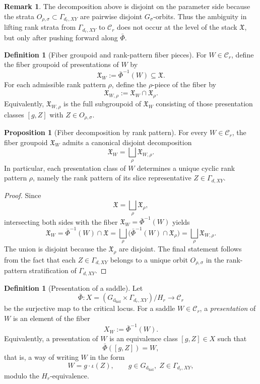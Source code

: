\documentclass{article}
\newcommand{\dhid}{\operatorname{d_{hid}}}
\theoremstyle{definition}
\newtheorem{proposition}[theorem]{Proposition}
\newtheorem{definition}[theorem]{Definition}
\newtheorem{remark}[theorem]{Remark}
\begin{document}
\begin{remark}
The decomposition above is disjoint on the parameter side because the strata
$O_{\rho,\sigma}\subset \Gamma_{d_r,XY}$ are pairwise disjoint $G_\sigma$-orbits. Thus the ambiguity in
lifting rank strata from $\Gamma_{d_r,XY}$ to $\mathcal C_r$ does not occur at the level of the stack
$\mathfrak X$, but only after pushing forward along $\bar\Phi$.
\end{remark}

\begin{definition}[Fiber groupoid and rank-pattern fiber pieces]
For $W\in \mathcal C_r$, define the fiber groupoid of presentations of $W$ by
\[
\mathfrak X_W
:=
\bar\Phi^{-1}(W)
\subseteq
\mathfrak X.
\]
For each admissible rank pattern $\rho$, define the $\rho$-piece of the fiber by
\[
\mathfrak X_{W,\rho}
:=
\mathfrak X_W\cap \mathfrak X_\rho.
\]
Equivalently, $\mathfrak X_{W,\rho}$ is the full subgroupoid of $\mathfrak X_W$ consisting of
those presentation classes $[g,Z]$ with $Z\in O_{\rho,\sigma}$.
\end{definition}

\begin{proposition}[Fiber decomposition by rank pattern]
For every $W\in \mathcal C_r$, the fiber groupoid $\mathfrak X_W$ admits a canonical disjoint
decomposition
\[
\mathfrak X_W
=
\bigsqcup_{\rho}\mathfrak X_{W,\rho}.
\]
In particular, each presentation class of $W$ determines a unique cyclic rank pattern $\rho$,
namely the rank pattern of its slice representative $Z\in \Gamma_{d,XY}$.
\end{proposition}

\begin{proof}
Since
\[
\mathfrak X=\bigsqcup_{\rho}\mathfrak X_\rho,
\]
intersecting both sides with the fiber $\mathfrak X_W=\bar\Phi^{-1}(W)$ yields
\[
\mathfrak X_W
=
\bar\Phi^{-1}(W)\cap \mathfrak X
=
\bigsqcup_{\rho}\bigl(\bar\Phi^{-1}(W)\cap \mathfrak X_\rho\bigr)
=
\bigsqcup_{\rho}\mathfrak X_{W,\rho}.
\]
The union is disjoint because the $\mathfrak X_\rho$ are disjoint. The final statement follows
from the fact that each $Z\in \Gamma_{d,XY}$ belongs to a unique orbit $O_{\rho,\sigma}$ in the
rank-pattern stratification of $\Gamma_{d,XY}$.
\end{proof}
\begin{definition}[Presentation of a saddle]
Let
\[
\bar\Phi \colon X=(G_{\dhid}\times \Gamma_{d_r,XY})/H_{r}\longrightarrow \mathcal C_r
\]
be the surjective map to the critical locus. For a saddle \(W\in \mathcal C_r\), a
\emph{presentation} of \(W\) is an element of the fiber
\[
X_W:=\bar\Phi^{-1}(W).
\]
Equivalently, a presentation of \(W\) is an equivalence class \([g,Z]\in X\)
such that
\[
\bar\Phi([g,Z])=W,
\]
that is, a way of writing \(W\) in the form
\[
W=g\cdot \iota(Z), \qquad g\in G_{\dhid},\; Z\in \Gamma_{d_r,XY},
\]
modulo the \(H_{r}\)-equivalence.
\end{definition}
\end{document}

